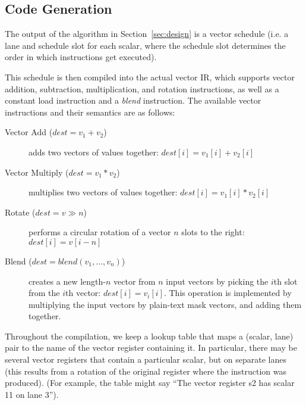 \subsection{Code Generation}\label{sec:codegen}
The output of the algorithm in Section~\ref{sec:design} is a vector schedule (i.e. a lane and schedule slot for each scalar, where the schedule slot determines the order in which instructions get executed).

This schedule is then compiled into the actual vector IR, which supports vector addition, subtraction, multiplication, and rotation instructions, as well as a constant load instruction and a {\em blend} instruction. The available vector instructions and their semantics are as follows:
\begin{description}
    \item[Vector Add ($dest = v_1 + v_2$)] adds two vectors of values together: $dest[i] = v_1[i] + v_2[i]$
    \item[Vector Multiply ($dest = v_1 * v_2$)] multiplies two vectors of values together: $dest[i] = v_1[i] * v_2[i]$
    \item[Rotate ($dest = v \gg n$)] performs a circular rotation of a vector $n$ slots to the right: $dest[i] = v[i - n]$ 
    \item[Blend ($dest = blend(v_1, \dots, v_n)$)] creates a new length-$n$ vector from $n$ input vectors by picking the $i$th slot from the $i$th vector: $dest[i] = v_i[i]$. This operation is implemented by multiplying the input vectors by plain-text mask vectors, and adding them together.
\end{description}



Throughout the compilation, we keep a lookup table that maps a (scalar, lane) pair to the name of the vector register containing it.
In particular, there may be several vector registers that contain a particular scalar, but on separate lanes (this results from a rotation of the original register where the instruction was produced).
(For example, the table might say ``The vector register {\sf s2} has scalar 11 on lane 3'').

